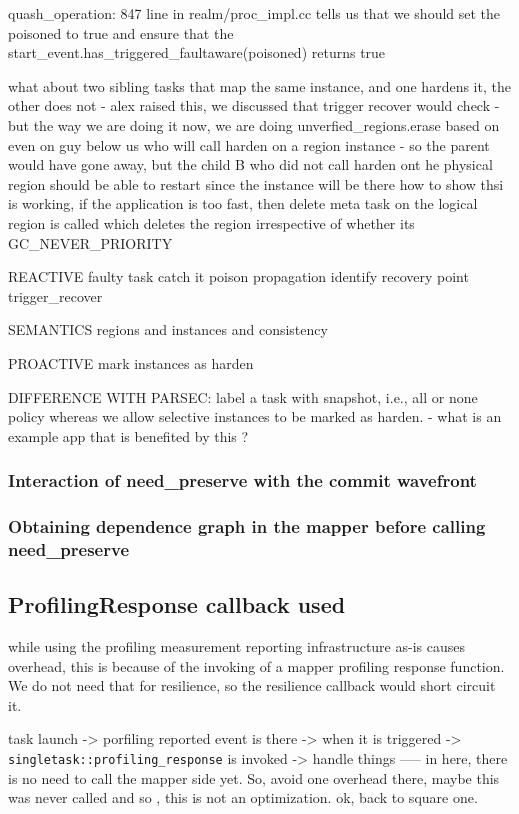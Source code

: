 quash_operation:
  847 line in realm/proc_impl.cc tells us that we should set the poisoned to true and ensure that the start_event.has_triggered_faultaware(poisoned) returns true

what about two sibling tasks that map the same instance, and one hardens it, the other does not
    - alex raised this, we discussed that trigger recover would check 
    - but the way we are doing it now, we are doing unverfied_regions.erase based on even on guy below us who will call harden on a region instance
    - so the parent would have gone away, but the child B who did not call harden ont he physical region should be able to restart since the instance will be there
how to show thsi is working, if the application is too fast, then delete meta task on the logical region is called which deletes the region irrespective of whether its GC_NEVER_PRIORITY

REACTIVE
faulty task
   catch it
   poison propagation
   identify recovery point
   trigger_recover

SEMANTICS
regions and instances and consistency

PROACTIVE
    mark instances as harden
    
DIFFERENCE WITH PARSEC:
    label a task with snapshot, i.e., all or none policy
    whereas we allow selective instances to be marked as harden.
      - what is an example app that is benefited by this ?

\subsubsection{Interaction of need\_preserve with the commit wavefront}
\subsubsection{Obtaining dependence graph in the mapper before calling need\_preserve} 


\subsection{ProfilingResponse callback used}
while using the profiling measurement reporting infrastructure as-is causes overhead, this is because of the invoking of a mapper profiling response function. We do not need that for resilience, so the resilience callback would short circuit it.

task launch -> porfiling reported event is there -> when it is triggered -> \texttt{singletask::profiling\_response} is invoked -> handle things
   ----- in here, there is no need to call the mapper side yet. So, avoid one overhead there, maybe this was never called and so , this is not an optimization. ok, back to square one. 

 

